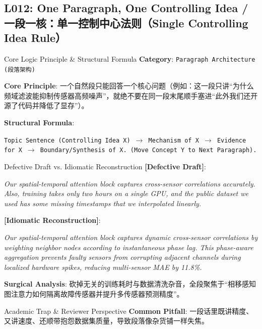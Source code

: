 \subsection{L012: One Paragraph, One Controlling Idea / 一段一核：单一控制中心法则（Single Controlling Idea Rule）}\label{sec:logic:L012}
\begin{ConceptBox}{Core Logic Principle \& Structural Formula}
\textbf{Category}: \texttt{Paragraph Architecture (段落架构)}\par\vspace{3pt}
\textbf{Core Principle}: 一个自然段只能回答一个核心问题（例如：这一段只讲“为什么频域滤波能抑制传感器高频噪声”，就绝不要在同一段末尾顺手塞进“此外我们还开源了代码并降低了显存”）。\par\vspace{4pt}
\textbf{Structural Formula}:\par\noindent\texttt{Topic Sentence (Controlling Idea X) $\to$ Mechanism of X $\to$ Evidence for X $\to$ Boundary/Synthesis of X. (Move Concept Y to Next Paragraph).}
\end{ConceptBox}
\begin{ExampleBox}{Defective Draft vs. Idiomatic Reconstruction}
\textbf{\color{TargetHighlight}[Defective Draft]}:\par\textit{Our spatial-temporal attention block captures cross-sensor correlations accurately. Also, training takes only two hours on a single GPU, and the public dataset we used has some missing timestamps that we interpolated linearly.}\par\vspace{4pt}
\textbf{\color{AcadNavy}[Idiomatic Reconstruction]}:\par\textit{Our spatial-temporal attention block captures dynamic cross-sensor correlations by weighting neighbor nodes according to instantaneous phase lag. This phase-aware aggregation prevents faulty sensors from corrupting adjacent channels during localized hardware spikes, reducing multi-sensor MAE by 11.8\%.}\par\vspace{4pt}
\textbf{Surgical Analysis}: 砍掉无关的训练耗时与数据清洗杂音，全段聚焦于“相移感知图注意力如何隔离故障传感器并提升多传感器预测精度”。
\end{ExampleBox}
\begin{TipBox}{Academic Trap \& Reviewer Perspective}
\textbf{Common Pitfall}: 一段话里既讲精度、又讲速度、还顺带抱怨数据集质量，导致段落像杂货铺一样失焦。
\end{TipBox}
\vspace{6pt}
